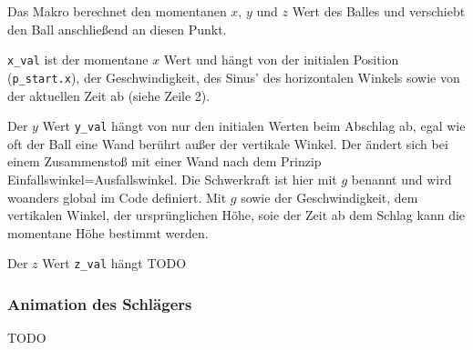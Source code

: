 Das Makro berechnet den momentanen $x$, $y$ und $z$ Wert des Balles und verschiebt den Ball anschließend an diesen Punkt. 

\texttt{x\_val} ist der momentane $x$ Wert und hängt von der initialen Position (\texttt{p\_start.x}), der Geschwindigkeit, des Sinus' des horizontalen Winkels sowie von der aktuellen Zeit ab (siehe Zeile 2).

Der $y$ Wert \texttt{y\_val} hängt von nur den initialen Werten beim Abschlag ab, egal wie oft der Ball eine Wand berührt außer der vertikale Winkel. Der ändert sich bei einem Zusammenstoß mit einer Wand nach dem Prinzip Einfallswinkel=Ausfallswinkel. Die Schwerkraft ist hier mit $g$ benannt und wird woanders global im Code definiert. Mit $g$ sowie der Geschwindigkeit, dem vertikalen Winkel, der ursprünglichen Höhe, soie der Zeit ab dem Schlag kann die momentane Höhe bestimmt werden.

Der $z$ Wert \texttt{z\_val} hängt TODO

\subsubsection{Animation des Schlägers}
TODO
